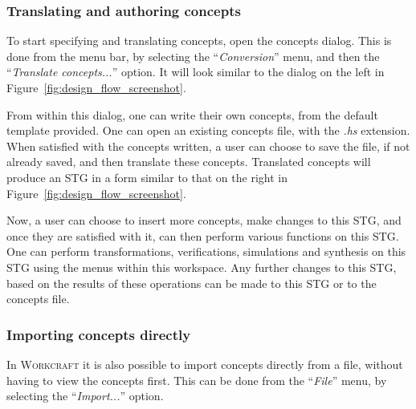 \documentclass[british,conference,compsoc]{IEEEtran}
\newcommand{\noun}[1]{\textsc{#1}}
\begin{document}
\vspace{-2mm}
 
\subsubsection{Translating and authoring concepts}

To start specifying and translating concepts, open the concepts dialog.  This is
done from the menu bar, by selecting the ``\emph{Conversion}'' menu, and then
the ``\emph{Translate concepts...}'' option. It will look similar to the dialog 
on the left in Figure~\ref{fig:design_flow_screenshot}.

From within this dialog, one can write their own concepts, from the default 
template provided. One can open an 
existing concepts file, with the \emph{.hs} extension. When satisfied with the 
concepts written, a user can choose to save the file, if not already saved, and
then translate these concepts. Translated concepts will produce an STG in a 
form similar to that on the right in Figure~\ref{fig:design_flow_screenshot}.

Now, a user can choose to insert more 
concepts, make changes to this STG, and once they are satisfied with it, can 
then perform various functions on this STG. One can perform transformations, 
verifications, simulations and synthesis on this STG using the menus within this 
workspace. Any further changes to this STG, based on the results of these 
operations can be made to this STG or to the concepts file. 

\subsubsection{Importing concepts directly}

\vspace{-2mm}

In \noun{Workcraft} it is also possible to import concepts directly from a file,
without having to view the concepts first. This can be done from the 
``\emph{File}'' menu, by selecting the ``\emph{Import...}'' option. 
\end{document}
